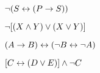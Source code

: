 \begin{earg}

\item $\neg (S \leftrightarrow (P \rightarrow S))$



 \item $\neg [(X \wedge Y) \vee (X \vee Y)]$



\item $(A \rightarrow B) \leftrightarrow (\neg B\leftrightarrow \neg A)$

\item $[C \leftrightarrow (D \vee E)] \wedge \neg C$



\end{earg}
